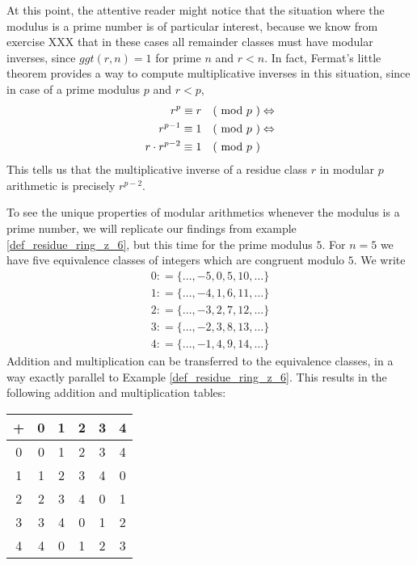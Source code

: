 At this point, the attentive reader might notice that the situation where the modulus is a prime number is of particular interest, because we know from exercise XXX that in these cases all remainder classes must have modular inverses, since $ggt(r,n)=1$ for prime $n$ and $r<n$. In fact, Fermat's little theorem provides a way to compute multiplicative inverses in this situation, since in case of a prime modulus $p$ and $r<p$, 
\begin{align*}
r^p \equiv r \quad \text{( mod } p \text{ )} & \Leftrightarrow \\
r^{p-1} \equiv 1 \quad \text{( mod } p \text{ )} & \Leftrightarrow \\
r\cdot r^{p-2} \equiv 1 \quad \text{( mod } p \text{ )}
\end{align*}
This tells us that the multiplicative inverse of a residue class $r$ in modular $p$ arithmetic is precisely $r^{p-2}$.
\begin{example}  
\label{primfield_z_5}
To see the unique properties of modular arithmetics whenever the modulus is a prime number, we will replicate our findings from example \ref{def_residue_ring_z_6}, but this time for the prime modulus $5$.
For $ n = 5 $ we have five equivalence classes of integers which are congruent modulo $ 5 $. We write
$$
\begin{array}{ccc}
0: = \{\ldots, -5,0,5,10, \ldots \}\\
1: = \{\ldots, -4,1,6,11, \ldots \}\\
2: = \{\ldots, -3,2,7,12, \ldots \} \\
3: = \{\ldots, -2,3,8,13, \ldots \}\\
4: = \{\ldots, -1,4,9,14, \ldots \}
\end{array}
$$
Addition and multiplication can be transferred to the equivalence classes, in a way exactly parallel to Example \ref{def_residue_ring_z_6}. This results in the following addition and multiplication tables:
\begin{center}
  \begin{tabular}{c | c c c c c}
    + & 0 & 1 & 2 & 3 & 4 \\\hline
    0 & 0 & 1 & 2 & 3 & 4 \\
    1 & 1 & 2 & 3 & 4 & 0 \\
    2 & 2 & 3 & 4 & 0 & 1 \\
    3 & 3 & 4 & 0 & 1 & 2 \\
    4 & 4 & 0 & 1 & 2 & 3 \\
  \end{tabular} \quad \quad \quad \quad
  \begin{tabular}{c | c c c c c}

\end{tabular}
\end{center}
\end{example}

